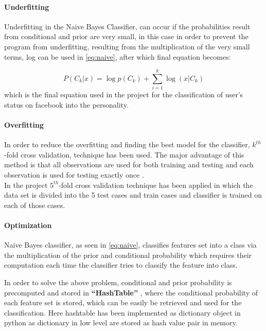 \paragraph{Underfitting}\hfill

Underfitting \cite{naive} in the Naive Bayes Classifier, can occur if the probabilities result from conditional and prior are very small, in this case in order to prevent the program from underfitting, resulting from the multiplication of the very small terms, log can be used in \ref{eq:naive}, after which final equation becomes:

\begin{equation}
P(C_k|x) = \log p(C_k) + \sum_{i=1}^{k} \log(x|C_k) 
\end{equation}
which is the final equation used in the project for the classification of user's status on facebook into the personality.

\paragraph{Overfitting}\hfill

In order to reduce the overfitting and finding the best model for the classifier, $k^{th}$-fold cross validation, technique has been used. The major advantage of this method is that all observations are used for both training and testing and each observation is used for testing exactly once \cite{cross}. \\
In the project $5^{th}$-fold cross validation technique has been applied in which the data set is divided into the 5 test cases and train cases and classifier is trained on each of those cases.

\paragraph{Optimization}\hfill

Naive Bayes classifier, as seen in \ref{eq:naive}, classifies features set into a class via the multiplication of the prior and conditional probability which requires their computation each time the classifier tries to classify the feature into class.

In order to solve the above problem, conditional and prior probability is precomputed and stored in \textbf{``HashTable''} \cite{naive}, where the conditional probability of each feature set is stored, which can be easily be retrieved and used for the classification. Here hashtable has been implemented as dictionary object in python as dictionary in low level are stored as hash value pair in memory.

